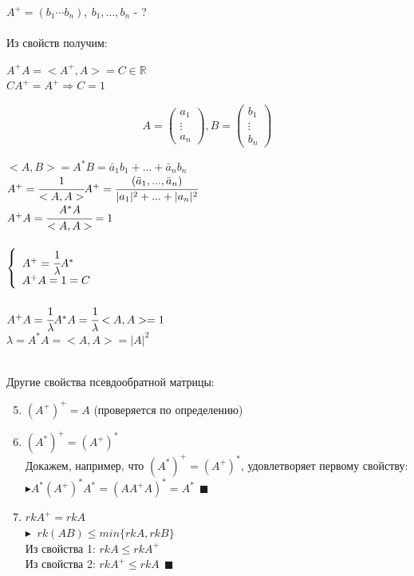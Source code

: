 \documentclass[12pt]{article}
\theoremstyle{definition}
\numberwithin{equation}{section}
\begin{document}
	$A^+=(b_1 \cdots b_n), ~ b_1,...,b_n$ - ?\\ \\
	Из свойств получим:
	\begin{center}
		$A^+A=<A^+, A>=C \in \mathbb{R}$\\
		$CA^+=A^+ \Rightarrow C=1$\\
	\end{center}
	\[A=\begin{pmatrix}
	a_1 \\
	\vdots \\         
	a_n
	\end{pmatrix}, B=\begin{pmatrix}
	b_1 \\
	\vdots \\         
	b_n
	\end{pmatrix}\] 
	\begin{center}
		$<A, B>=A^*B=\bar a_1 b_1+...+\bar a_n b_n$\\ 
		$A^+=\cfrac{1}{<A, A>}A^+=\cfrac{(\bar a_1,..., \bar a_n)}{|a_1|^2+...+|a_n|^2}$\\ 
		$A^+A=\cfrac{A^*A}{<A, A>}=1$\\~\\
		$
		\left\{  
		\begin{array}{ll}  
		A^+=\cfrac{1}{\lambda}A^*\\
		A^+A=1=C
		\end{array}   
		\right.  
		$
		\\ ~\\
		$A^+A=\cfrac{1}{\lambda}A^*A=\cfrac{1}{\lambda}<A, A>=1$\\
		$\lambda =A^*A=<A, A>=|A|^2$\\
	\end{center} 
	~\\Другие свойства псевдообратной матрицы:
	\begin{enumerate}
		\setcounter{enumi}{4}
		\item $(A^+)^+=A$ (проверяется по определению)
		\item $(A^*)^+=(A^+)^*$\\
		Докажем, например, что $(A^*)^+=(A^+)^*$, удовлетворяет первому свойству:\\
		$\blacktriangleright A^*(A^+)^*A^*=(AA^+A)^*=A^* ~~\blacksquare$
		\item $rkA^+=rkA$\\
		$\blacktriangleright$ $~rk(AB) \leqslant min\{rkA, rkB\}$\\
		Из свойства 1: $rkA \leqslant rkA^+$\\
		Из свойства 2: $rkA^+ \leqslant rkA ~~\blacksquare$
	\end{enumerate}
\end{document}
